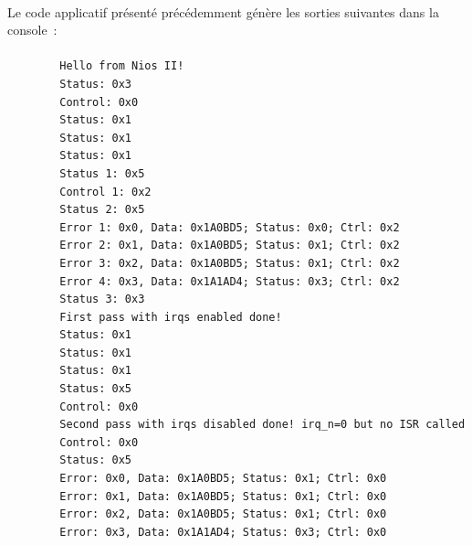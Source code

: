 \documentclass[a4paper, 11pt, svgnames]{report}
\begin{document}
        \paragraph{}
        Le code applicatif présenté précédemment génère les sorties suivantes dans la console~:

        \paragraph{}
        \begin{verbatim}
        Hello from Nios II!
        Status: 0x3
        Control: 0x0
        Status: 0x1
        Status: 0x1
        Status: 0x1
        Status 1: 0x5
        Control 1: 0x2
        Status 2: 0x5
        Error 1: 0x0, Data: 0x1A0BD5; Status: 0x0; Ctrl: 0x2
        Error 2: 0x1, Data: 0x1A0BD5; Status: 0x1; Ctrl: 0x2
        Error 3: 0x2, Data: 0x1A0BD5; Status: 0x1; Ctrl: 0x2
        Error 4: 0x3, Data: 0x1A1AD4; Status: 0x3; Ctrl: 0x2
        Status 3: 0x3
        First pass with irqs enabled done!
        Status: 0x1
        Status: 0x1
        Status: 0x1
        Status: 0x5
        Control: 0x0
        Second pass with irqs disabled done! irq_n=0 but no ISR called
        Control: 0x0
        Status: 0x5
        Error: 0x0, Data: 0x1A0BD5; Status: 0x1; Ctrl: 0x0
        Error: 0x1, Data: 0x1A0BD5; Status: 0x1; Ctrl: 0x0
        Error: 0x2, Data: 0x1A0BD5; Status: 0x1; Ctrl: 0x0
        Error: 0x3, Data: 0x1A1AD4; Status: 0x3; Ctrl: 0x0
        \end{verbatim}
\end{document}
